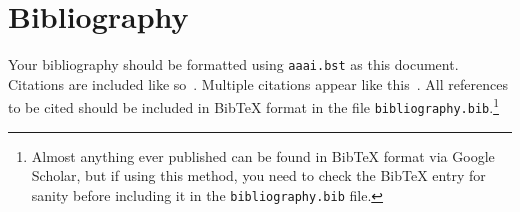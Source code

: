\documentclass[letterpaper]{article}
\begin{document}
\section{Bibliography}
Your bibliography should be formatted using \texttt{aaai.bst} as this document. Citations are included like so~\cite{book2015}. Multiple citations appear like this~\cite{conf,article}. All references to be cited should be included in BibTeX format in the file \texttt{bibliography.bib}.\footnote{Almost anything ever published can be found in BibTeX format via Google Scholar, but if using this method, you need to check the BibTeX entry for sanity before including it in the \texttt{bibliography.bib} file.}





\end{document}
